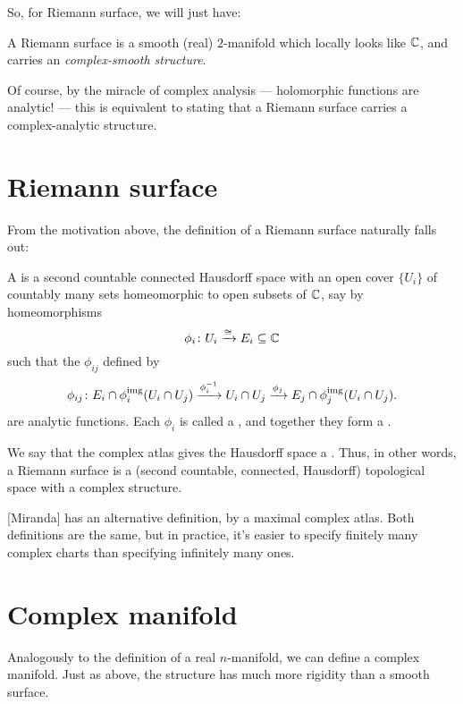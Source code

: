 So, for Riemann surface, we will just have:
\begin{moral}
	A Riemann surface is a smooth (real) $2$-manifold which locally looks like $\mathbb C$, and carries an
	\emph{complex-smooth structure}.
\end{moral}

Of course, by the miracle of complex analysis --- holomorphic functions are analytic! --- this is
equivalent to stating that a Riemann surface carries a complex-analytic structure.

\section{Riemann surface}

From the motivation above, the definition of a Riemann surface naturally falls out:
\begin{definition}
	A  is a second countable connected Hausdorff space with an open cover
	$\{ U_i \}$ of countably many sets homeomorphic to open subsets of $\mathbb C$, say by homeomorphisms
	\[ \phi_i \colon U_i \xrightarrow{\cong} E_i \subseteq \mathbb C \]
	such that the  $\phi_{ij}$ defined by
	\[
		\phi_{ij} \colon E_i \cap \phi_i^{\text{img}}(U_i \cap U_j)
		\xrightarrow{\phi_i^{-1}}
		U_i \cap U_j
		\xrightarrow{\phi_j} E_j \cap \phi_j^{\text{img}}(U_i \cap U_j).
	\]
	are analytic functions.
	Each $\phi_i$ is called a , and together they form a .
\end{definition}

We say that the complex atlas gives the Hausdorff space a .
Thus, in other words, a Riemann surface is a (second countable, connected, Hausdorff) topological
space with a complex structure.

[Miranda] has an alternative definition, by a maximal complex atlas. Both definitions are the same,
but in practice, it's easier to specify finitely many complex charts than specifying infinitely many
ones.

\section{Complex manifold}
Analogously to the definition of a real $n$-manifold, we can define a complex manifold.
Just as above, the structure has much more rigidity than a smooth surface.

